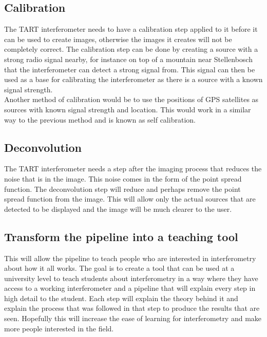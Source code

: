 \subsection{Calibration}
The TART interferometer needs to have a calibration step applied to it before it can be used to create images, otherwise the images it creates will not be completely correct. The calibration step can be done by creating a source with a strong radio signal nearby, for instance on top of a mountain near Stellenbosch that the interferometer can detect a strong signal from. This signal can then be used as a base for calibrating the interferometer as there is a source with a known signal strength.\\
Another method of calibration would be to use the positions of GPS satellites as sources with known signal strength and location\cite{CALIBRATION_TART}. This would work in a similar way to the previous method and is known as self calibration. 
\subsection{Deconvolution}
The TART interferometer needs a step after the imaging process that reduces the noise that is in the image. This noise comes in the form of the point spread function. The deconvolution step will reduce and perhaps remove the point spread function from the image. This will allow only the actual sources that are detected to be displayed and the image will be much clearer to the user.
\subsection{Transform the pipeline into a teaching tool}
This will allow the pipeline to teach people who are interested in interferometry about how it all works. 
The goal is to create a tool that can be used at a university level to teach students about interferometry in a way where they have access to a working interferometer and a pipeline that will explain every step in high detail to the student. Each step will explain the theory behind it and explain the process that was followed in that step to produce the results that are seen. Hopefully this will increase the ease of learning for interferometry and make more people interested in the field.